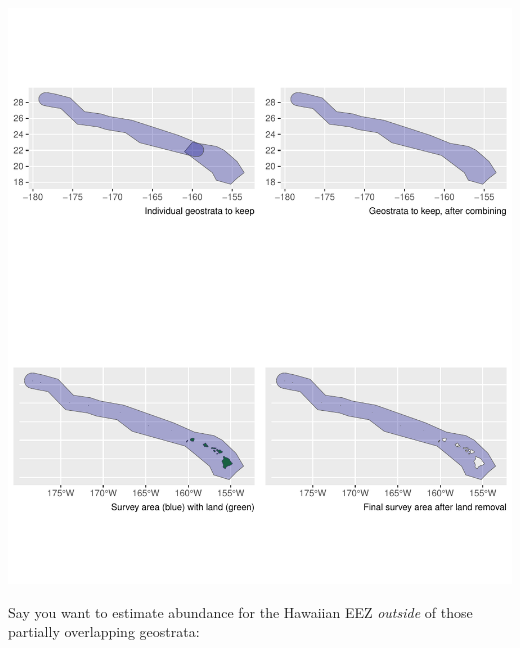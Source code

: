 \documentclass[
]{book}
\newenvironment{Shaded}{\begin{snugshade}}{\end{snugshade}}
\newcommand{\AttributeTok}[1]{\textcolor[rgb]{0.13,0.29,0.53}{#1}}
\newcommand{\ConstantTok}[1]{\textcolor[rgb]{0.56,0.35,0.01}{#1}}
\newcommand{\FunctionTok}[1]{\textcolor[rgb]{0.13,0.29,0.53}{\textbf{#1}}}
\newcommand{\NormalTok}[1]{#1}
\newcommand{\OtherTok}[1]{\textcolor[rgb]{0.56,0.35,0.01}{#1}}
\newcommand{\SpecialCharTok}[1]{\textcolor[rgb]{0.81,0.36,0.00}{\textbf{#1}}}
\newcommand{\StringTok}[1]{\textcolor[rgb]{0.31,0.60,0.02}{#1}}
\begin{document}
\includegraphics{figures/unnamed-chunk-257-1.pdf}

Say you want to estimate abundance for the Hawaiian EEZ \emph{outside} of those partially overlapping geostrata:

\begin{Shaded}
\end{Shaded}
\end{document}
